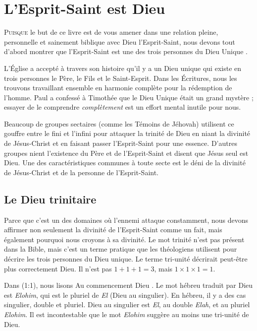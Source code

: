 \chapter{L'Esprit-Saint est Dieu}

\lettrine{P}{uisque} le but de ce livre est de vous amener
 dans une relation pleine, personnelle et sainement biblique avec
 Dieu l'Esprit-Saint, nous devons tout d'abord montrer que l'Esprit-Saint
 est une des trois personnes du Dieu Unique
 .

L'Église a accepté à travers son histoire qu'il y a un Dieu unique
 qui existe en trois personnes\frcolon{} le Père, le Fils et le Saint-Esprit.
 Dans les Écritures, nous les trouvons travaillant ensemble en harmonie
 complète pour la rédemption de l'homme.
 Paul a confessé à Timothée que le Dieu Unique était un grand mystère ;
 essayer de le comprendre \emph{complètement} est un effort mental inutile
 pour nous.

Beaucoup de groupes sectaires (comme les Témoins de Jéhovah) utilisent
 ce gouffre entre le fini et l'infini pour attaquer la trinité de Dieu
 en niant la divinité de Jésus-Christ et en faisant passer l'Esprit-Saint
 pour une essence.
 D'autres groupes nient l'existence du Père et de l'Esprit-Saint et disent
 que Jésus seul est Dieu.
 Une des caractéristiques communes à toute secte est le déni de la divinité
 de Jésus-Christ et de la personne de l'Esprit-Saint.

\section{Le Dieu trinitaire}

Parce que c'est un des domaines où l'ennemi attaque constamment, nous devons
 affirmer non seulement la divinité de l'Esprit-Saint comme un fait,
 mais également pourquoi nous croyons à sa divinité.
 Le mot \Og trinité \Fg{} n'est pas présent dans la Bible, mais c'est un
 terme pratique que les théologiens utilisent pour décrire les trois personnes
 du Dieu unique.
 Le terme \Og tri-unité \Fg{} décrirait peut-être plus correctement Dieu.
 Il n'est pas $1 + 1 + 1 = 3$, mais $1 \times 1 \times 1 = 1$.

Dans (1:1), nous lisons\frcolon{}
 \Og Au commencement Dieu \Fg{}.
 Le mot hébreu traduit par \Og Dieu \Fg{} est \emph{Elohim}, qui est
 le pluriel de \emph{El} (Dieu au singulier).
 En hébreu, il y a des cas singulier, double et pluriel.
 \Og Dieu \Fg{} au singulier est \emph{El}, au double \emph{Elah},
 et au pluriel \emph{Elohim}.
 Il est incontestable que le mot \emph{Elohim} suggère au moins
 une tri-unité de Dieu.

